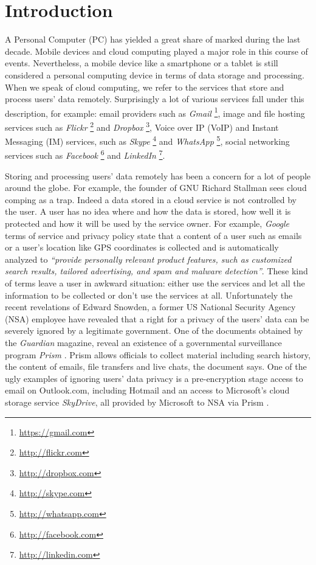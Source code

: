 \section{Introduction}

A Personal Computer (PC) has yielded a great share of marked during the
last decade. Mobile devices and cloud computing played a major role in
this course of events. Nevertheless, a mobile device like a smartphone or a
tablet is still considered a personal computing device in terms of data
storage and processing. When we speak of cloud computing, we refer to
the services that store and process users' data remotely.
Surprisingly a lot of various services fall under this description,
for example: email providers such as
\emph{Gmail} \footnote{\url{https://gmail.com}},
image and file hosting services such as
\emph{Flickr} \footnote{\url{http://flickr.com}} and
\emph{Dropbox} \footnote{\url{http://dropbox.com}},
Voice over IP (VoIP) and Instant Messaging (IM) services, such as
\emph{Skype} \footnote{\url{http://skype.com}} and
\emph{WhatsApp} \footnote{\url{http://whatsapp.com}},
social networking services such as
\emph{Facebook} \footnote{\url{http://facebook.com}} and
\emph{LinkedIn} \footnote{\url{http://linkedin.com}}.

Storing and processing users' data remotely has been a concern for
a lot of people around the globe. For example, the founder of GNU
Richard Stallman sees cloud comping as a trap\cite{stallman-cloud-08}.
Indeed a data stored in a cloud service is not controlled by the user.
A user has no idea where and how the data is stored, how well it is
protected and how it will be used by the service owner.
For example, \emph{Google} terms of service\cite{google-tos} and
privacy policy\cite{google-privacy} state that a content of a user
such as emails or a user's location like GPS coordinates is collected
and is automatically analyzed to
\emph{``provide personally relevant product
features, such as customized search results, tailored advertising,
and spam and malware detection''}.
These kind of terms leave a user
in awkward situation: either use the services and let all the information
to be collected or don't use the services at all.
Unfortunately the recent revelations\cite{snowden-timeline}
of Edward Snowden, a former US National Security Agency (NSA) employee
have revealed that a right for a privacy of the users' data can be
severely ignored by a legitimate government.
One of the documents obtained by the \emph{Guardian} magazine,
reveal an existence of a governmental surveillance program \emph{Prism}
\cite{snowden-prism}. Prism allows officials to collect
material including search history, the content of emails, file
transfers and live chats, the document says. One of the ugly examples
of ignoring users' data privacy is a pre-encryption stage access
to email on Outlook.com, including Hotmail and an access to Microsoft's
cloud storage service \emph{SkyDrive}, all provided by Microsoft to NSA
via Prism \cite{snowden-ms-nsa}.

